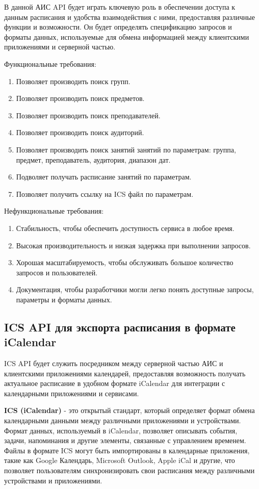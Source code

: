 В данной АИС API будет играть ключевую роль в обеспечении доступа к данным расписания
и удобства взаимодействия с ними, предоставляя различные функции и возможности.
Он будет определять спецификацию запросов и форматы данных,
используемые для обмена информацией между клиентскими приложениями и серверной частью.

Функциональные требования:
\begin{enumerate}
  \item Позволяет производить поиск групп.
  \item Позволяет производить поиск предметов.
  \item Позволяет производить поиск преподавателей.
  \item Позволяет производить поиск аудиторий.
  \item Позволяет производить поиск занятий занятий по параметрам:
  группа, предмет, преподаватель, аудитория, диапазон дат.
  \item Подволяет получать расписание занятий по параметрам.
  \item Позволяет получить ссылку на ICS файл по параметрам.
\end{enumerate}

Нефункциональные требования:
\begin{enumerate}
  \item Стабильность, чтобы обеспечить доступность сервиса в любое время.
  \item Высокая производительность и низкая задержка при выполнении запросов.
  \item Хорошая масштабируемость, чтобы обслуживать большое количество запросов и пользователей.
  \item Документация, чтобы разработчики могли легко понять доступные запросы,
  параметры и форматы данных.
\end{enumerate}

\subsection{ICS API для экспорта расписания в формате iCalendar}
ICS API будет служить посредником между серверной частью АИС и клиентскими
приложениями календарей,
предоставляя возможность получать актуальное расписание в удобном формате iCalendar
для интеграции с календарными приложениями и сервисами.

\textbf{ICS (iCalendar)} - это открытый стандарт,
который определяет формат обмена календарными данными между различными приложениями и устройствами.
Формат данных, используемый в iCalendar, позволяет описывать события, задачи, напоминания и другие элементы,
связанные с управлением временем. Файлы в формате ICS могут быть импортированы в календарные приложения,
такие как Google Календарь, Microsoft Outlook, Apple iCal и другие,
что позволяет пользователям синхронизировать свои расписания между различными устройствами и приложениями.

